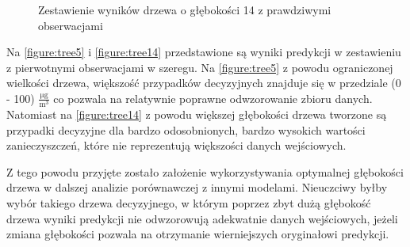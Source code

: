 \documentclass[10pt,a4paper]{article}
\begin{document}
\FloatBarrier
\begin{figure}[!ht]
	\centering
	\caption{Zestawienie wyników drzewa o głębokości 14 z prawdziwymi obserwacjami}
	\label{figure:tree14}
\end{figure}
\FloatBarrier

Na \autoref{figure:tree5} i \autoref{figure:tree14} przedstawione są wyniki predykcji w zestawieniu z pierwotnymi obserwacjami w szeregu. Na \autoref{figure:tree5} z powodu ograniczonej wielkości drzewa, większość przypadków decyzyjnych znajduje się w przedziale (0 - 100) $\frac{\si{\micro\gram}}{\si\meter^3}$ co pozwala na relatywnie poprawne odwzorowanie zbioru danych. Natomiast na \autoref{figure:tree14} z powodu większej głębokości drzewa tworzone są przypadki decyzyjne dla bardzo odosobnionych, bardzo wysokich wartości zanieczyszczeń, które nie reprezentują większości danych wejściowych. 

Z tego powodu przyjęte zostało założenie wykorzystywania optymalnej głębokości drzewa w dalszej analizie porównawczej z innymi modelami. Nieuczciwy byłby wybór takiego drzewa decyzyjnego, w którym poprzez zbyt dużą głębokość drzewa wyniki predykcji nie odwzorowują adekwatnie danych wejściowych, jeżeli zmiana głębokości pozwala na otrzymanie wierniejszych oryginałowi predykcji.
\end{document}
